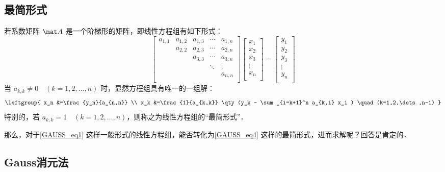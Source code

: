 \subsection{最简形式}
若系数矩阵 $\mat A$ 是一个阶梯形的矩阵，即线性方程组有如下形式：
\begin{equation}\label{GAUSS_eq4}
{
	\left[ \begin{matrix}
	a_{1,1} &a_{1,2} &a_{1,3} &\cdots &a_{1,n} \\
	        &a_{2,2} &a_{2,3} &\cdots &a_{2,n} \\
	        &        &a_{3,3} &\cdots &a_{3,n} \\
             &        &        &\ddots &\vdots  \\
	        &        &        &       &a_{n,n} \\
	\end{matrix} 
	\right ]}
{
	\left[ \begin{matrix}
	x_1 \\
	x_2 \\
     x_3 \\
     \vdots \\
	x_n \\
	\end{matrix} 
	\right ]}=
{
	\left[ \begin{matrix}
	y_1 \\
	y_2 \\
     y_3 \\
     \vdots \\
	y_n \\
	\end{matrix} 
	\right ]}
\end{equation}
当 $a_{k,k}\neq 0 \quad (k=1,2,\dots,n)$ 时，显然方程组具有唯一的一组解：
\begin{equation}\label{GAUSS_eq5}
\leftgroup{
x_n &=\frac{y_n}{a_{n,n}} \\
x_k &=\frac{1}{a_{k,k}} \qty(y_k - \sum_{i=k+1}^n a_{k,i} x_i ) \quad (k=1,2,\dots,n-1) }\\
\end{equation}
特别的，若 $a_{k,k} = 1 \quad (k=1,2,\dots,n)$，则称之为线性方程组的“最简形式”．

那么，对于\autoref{GAUSS_eq1} 这样一般形式的线性方程组，能否转化为\autoref{GAUSS_eq4} 这样的最简形式，进而求解呢？回答是肯定的．

\subsection{Gauss消元法}

